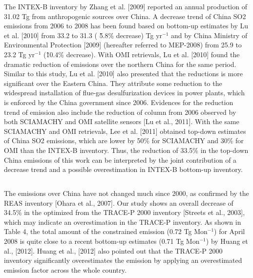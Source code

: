   The INTEX-B inventory by Zhang et al. [2009] reported an annual production of 31.02 Tg from anthropogenic sources over China. 
A decrease trend of China SO2 emissions from 2006 to 2008 has been found based on bottom-up estimates by Lu et al. [2010] from 33.2 to 31.3 ( \~5.8\% decrease) Tg yr$^{-1}$
and by China Ministry of Environmental Protection [2009] (hereafter referred to MEP-2008) from 25.9 to 23.2 Tg yr$^{-1}$ (\~10.4\% decrease).
With OMI  retrievals, Lu et al. [2010] found the dramatic reduction of  emissions over the northern China for the same period. 
Similar to this study, Lu et al. [2010] also presented that the reductions is more significant over the Eastern China. 
They attribute some reduction to the widespread installation of flue-gas desulfurization devices in power plants, which is enforced by the China government since 2006. 
Evidences for the reduction trend of  emission also include the reduction of  column from 2006 observed by both SCIAMACHY and OMI satellite sensors [Lu et al., 2011].
With the same SCIAMACHY and OMI  retrievals, Lee et al. [2011] obtained top-down estimates of China SO2 emissions, 
which are lower by 50\% for SCIAMACHY and 30\% for OMI than the INTEX-B inventory. 
Thus, the reduction of 33.5\% in the top-down China  emissions of this work can be interpreted by the joint contribution of a decrease trend and a possible overestimation in INTEX-B bottom-up inventory.

 \subsection{ } 
  The  emissions over China have not changed much since 2000, as confirmed by the REAS inventory [Ohara et al., 2007]. 
Our study shows an overall decrease of 34.5\% in the optimized from the TRACE-P 2000 inventory [Streets et al., 2003], 
which may indicate an overestimation in the TRACE-P inventory. 
As shown in Table 4, the total amount of the constrained  emission (0.72 Tg Mon$^{-1}$) for April 2008 is quite close to a recent bottom-up estimates (0.71 Tg Mon$^{-1}$) by Huang et al., [2012]. 
Huang et al., [2012] also pointed out that the TRACE-P 2000 inventory significantly overestimates the  emission by applying an overestimated emission factor across the whole country. 

